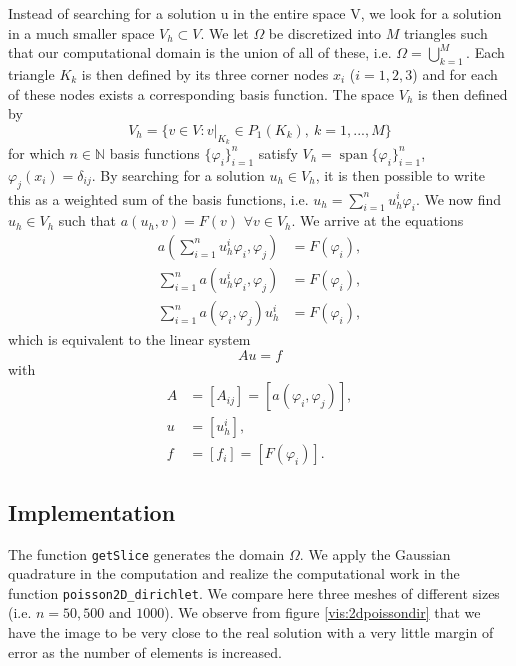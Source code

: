 \documentclass{report}
\DeclareMathOperator{\spn}{span}
\def\N{\mathbb{N}}
\begin{document}
Instead of searching for a solution u in the entire space V, we look for a solution in a much smaller space $V_h \subset V$. We let $\Omega$ be discretized into $M$ triangles such that our computational
domain is the union of all of these, i.e. $\Omega = \bigcup_{k=1}^M$. Each triangle $K_k$ is then defined by its three corner nodes $x_i$ ($i=1,2,3$) and for each of these nodes exists a corresponding basis function. The space $V_h$ is then defined by
\begin{equation}
	V_h = \{ v \in V: v|_{K_k} \in P_1 (K_k),\ k  = 1,...,M\}
\end{equation}
for which $n \in \N$ basis functions $\{\varphi_i\}_{i=1}^n $ satisfy $V_h = \spn\{\varphi_i\}_{i=1}^n$, $\varphi_j (x_i) = \delta_{ij}$. By searching for a solution $u_h \in V_h$, it is then possible to write this as a weighted sum of the basis functions, i.e. $u_h = \sum_{i=1}^n u_h^i \varphi_i$. We now find $u_h \in V_h$ such that $a(u_h , v) = F(v)$ $\forall v \in V_h$. We arrive at the equations
\begin{align}
	a\left(\sum_{i=1}^n u_h^i \varphi_i , \varphi_j\right) &= F (\varphi_i), \\
	\sum_{i=1}^n a(u_h^i \varphi_i , \varphi_j) &= F (\varphi_i), \\
	\sum_{i=1}^n a(\varphi_i , \varphi_j) u_h^i &= F (\varphi_i),
\end{align}
which is equivalent to the linear system
\begin{equation} \label{poissondirhomlinsys}
	Au = f
\end{equation}
with
\begin{align}
	A &= [A_{ij}] = [a(\varphi_i , \varphi_j)], \\
	u &= [u_h^i], \\
	f &= [f_i] = [F (\varphi_i)].
\end{align}

\subsection{Implementation}

The function \texttt{getSlice} generates the domain $\Omega$. We apply the Gaussian quadrature in the computation and realize the computational work in the function \texttt{poisson2D\_dirichlet}. We compare here three meshes of different sizes (i.e. $n= 50, 500$ and $1000$). We observe from figure \ref{vis:2dpoissondir} that we have the image to be very close to the real solution with a very little margin of error as the number of elements is increased.
\end{document}

